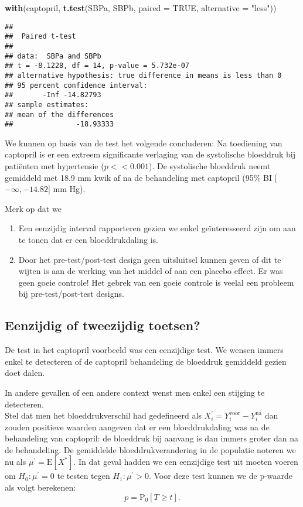 \documentclass[12pt,dutch,coursenotes]{book}
\newenvironment{Shaded}{\begin{snugshade}}{\end{snugshade}}
\newcommand{\KeywordTok}[1]{\textcolor[rgb]{0.13,0.29,0.53}{\textbf{#1}}}
\newcommand{\DataTypeTok}[1]{\textcolor[rgb]{0.13,0.29,0.53}{#1}}
\newcommand{\StringTok}[1]{\textcolor[rgb]{0.31,0.60,0.02}{#1}}
\newcommand{\OtherTok}[1]{\textcolor[rgb]{0.56,0.35,0.01}{#1}}
\newcommand{\NormalTok}[1]{#1}
\providecommand{\tightlist}{%
  \setlength{\itemsep}{0pt}\setlength{\parskip}{0pt}}
\theoremstyle{definition}
\theoremstyle{definition}
\theoremstyle{definition}
\theoremstyle{remark}
\begin{document}
\begin{Shaded}
\begin{Highlighting}[]
\KeywordTok{with}\NormalTok{(captopril, }\KeywordTok{t.test}\NormalTok{(SBPa, SBPb, }\DataTypeTok{paired =} \OtherTok{TRUE}\NormalTok{, }\DataTypeTok{alternative =} \StringTok{"less"}\NormalTok{))}
\end{Highlighting}
\end{Shaded}

\begin{verbatim}
## 
##  Paired t-test
## 
## data:  SBPa and SBPb
## t = -8.1228, df = 14, p-value = 5.732e-07
## alternative hypothesis: true difference in means is less than 0
## 95 percent confidence interval:
##       -Inf -14.82793
## sample estimates:
## mean of the differences 
##               -18.93333
\end{verbatim}

We kunnen op basis van de test het volgende concluderen: Na toediening
van captopril is er een extreem significante verlaging van de
systolische bloeddruk bij patiënten met hypertensie (\(p << 0.001\)). De
systolische bloeddruk neemt gemiddeld met 18.9 mm kwik af na de
behandeling met captopril (95\% BI {[}\(-\infty,-14.82\){]} mm Hg).

Merk op dat we

\begin{enumerate}
\def\labelenumi{\arabic{enumi}.}
\tightlist
\item
  Een eenzijdig interval rapporteren gezien we enkel geïnteresseerd zijn
  om aan te tonen dat er een bloeddrukdaling is.
\item
  Door het pre-test/post-test design geen uitsluitsel kunnen geven of
  dit te wijten is aan de werking van het middel of aan een placebo
  effect. Er was geen goeie controle! Het gebrek van een goeie controle
  is veelal een probleem bij pre-test/post-test designs.
\end{enumerate}

\subsection{Eenzijdig of tweezijdig
toetsen?}\label{eenzijdig-of-tweezijdig-toetsen}

De test in het captopril voorbeeld was een eenzijdige test. We wensen
immers enkel te detecteren of de captopril behandeling de bloeddruk
gemiddeld gezien doet dalen.

In andere gevallen of een andere context wenst men enkel een stijging te
detecteren.\\
Stel dat men het bloeddrukverschil had gedefineerd als
\(X_{i}^\prime=Y_{i}^\text{voor}-Y_{i}^\text{na}\) dan zouden positieve
waarden aangeven dat er een bloeddrukdaling was na de behandeling van
captopril: de bloeddruk bij aanvang is dan immers groter dan na de
behandeling. De gemiddelde bloeddrukverandering in de populatie noteren
we nu als \(\mu^\prime=\text{E}[X^*]\). In dat geval hadden we een
eenzijdige test uit moeten voeren om \(H_0: \mu^\prime=0\) te testen
tegen \(H_1: \mu^\prime>0\). Voor deze test kunnen we de p-waarde als
volgt berekenen: \[p=\text{P}_0\left[T\geq t\right].\]
\end{document}
